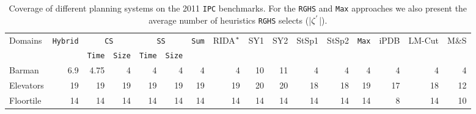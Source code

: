 \begin{table}[htb]
\footnotesize\setlength{\tabcolsep}{1.8pt}
\centering
\caption{Coverage of different planning systems on the 2011 \texttt{IPC} benchmarks. For the \texttt{RGHS} and \texttt{Max} approaches we also present the average number of heuristics \texttt{RGHS} selects (|$\zeta\sp{'}$|).}
\begin{tabular}{lrrrrrrrrrrrrrrr}
\hline
\multirow{2}{*}{Domains} & \multirow{2}{*}{\texttt{Hybrid}} & \multicolumn{2}{c}{\texttt{CS}} & \multicolumn{2}{c}{\texttt{SS}} & \multirow{2}{*}{\texttt{Sum}} & \multirow{2}{*}{RIDA$\sp{*}$} & \multirow{2}{*}{SY1} & \multirow{2}{*}{SY2} & \multirow{2}{*}{StSp1} & \multirow{2}{*}{StSp2} & \multirow{2}{*}{\texttt{Max}} & \multirow{2}{*}{iPDB} & \multirow{2}{*}{LM-Cut} & \multirow{2}{*}{M$\&$S} \\ \cline{3-6}
                         &                                    & \texttt{Time} & \texttt{Size} & \texttt{Time} & \texttt{Size} &                                 &                       &                      &                      &                        &                        &                                 &                       &                         &                         \\ \hline
Barman                   & 6.9                                & 4.75            & 4               & 4               & 4               & 4                               & 4                     & 10                   & 11                   & 4                      & 4                      & 4                               & 4                     & 4                       & 4                       \\
Elevators                & 19                                 & 19              & 19              & 19              & 19              & 19                              & 19                    & 20                   & 20                   & 18                     & 18                     & 19                              & 17                    & 18                      & 12                      \\
Floortile                & 14                                 & 14              & 14              & 14              & 14              & 14                              & 14                    & 14                   & 14                   & 14                     & 14                     & 14                              & 8                     & 14                      & 10                      \\

\end{tabular}
\end{table}
